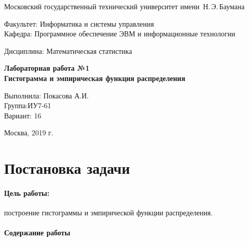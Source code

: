 \documentclass[a4paper, 12pt]{article}
\theoremstyle{definition}
\begin{document}
\thispagestyle{empty}

\begin{center}
    \Large
    Московский государственный технический университет имени~Н.\,Э.\,Баумана
\end{center}

{\large
\noindent
Факультет: Информатика и системы управления\\[2mm]
\noindent
Кафедра: Программное обеспечение ЭВМ и информационные технологии\\[2mm]
\noindent

Дисциплина: Математическая статистика
\vspace{1.5cm}}

\begin{center}
    \Large
    \textbf{Лабораторная работа №1} \\
    \textbf{Гистограмма и эмпирическая функция распределения} \\
\end{center}
\vfill

\hfill\begin{minipage}{0.35\textwidth}
    Выполнила: Покасова А.И.\\
    Группа:ИУ7-61 \\
    Вариант: 16
\end{minipage}
\vfill

\begin{center}
    Москва, 2019 г.
\end{center}

\newpage
\section{Постановка задачи}

\paragraph{Цель работы:} построение гистограммы и эмпирической функции распределения.

\paragraph{Содержание работы}
\end{document}
